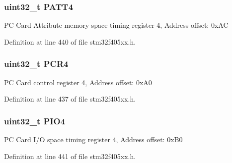 \subsubsection[{\texorpdfstring{P\+A\+T\+T4}{PATT4}}]{ uint32\+\_\+t P\+A\+T\+T4}\hypertarget{struct_f_s_m_c___bank4___type_def_a955cad1aab7fb2d5b6e216cb29b5e7e2}{}\label{struct_f_s_m_c___bank4___type_def_a955cad1aab7fb2d5b6e216cb29b5e7e2}
PC Card Attribute memory space timing register 4, Address offset\+: 0x\+AC 

Definition at line 440 of file stm32f405xx.\+h.

\subsubsection[{\texorpdfstring{P\+C\+R4}{PCR4}}]{ uint32\+\_\+t P\+C\+R4}\hypertarget{struct_f_s_m_c___bank4___type_def_a2f02e7acfbd7e549ede84633215eb6a1}{}\label{struct_f_s_m_c___bank4___type_def_a2f02e7acfbd7e549ede84633215eb6a1}
PC Card control register 4, Address offset\+: 0x\+A0 

Definition at line 437 of file stm32f405xx.\+h.

\subsubsection[{\texorpdfstring{P\+I\+O4}{PIO4}}]{ uint32\+\_\+t P\+I\+O4}\hypertarget{struct_f_s_m_c___bank4___type_def_ac53cd7a08093a4ae8f4de4bcff67a64f}{}\label{struct_f_s_m_c___bank4___type_def_ac53cd7a08093a4ae8f4de4bcff67a64f}
PC Card I/O space timing register 4, Address offset\+: 0x\+B0 

Definition at line 441 of file stm32f405xx.\+h.

